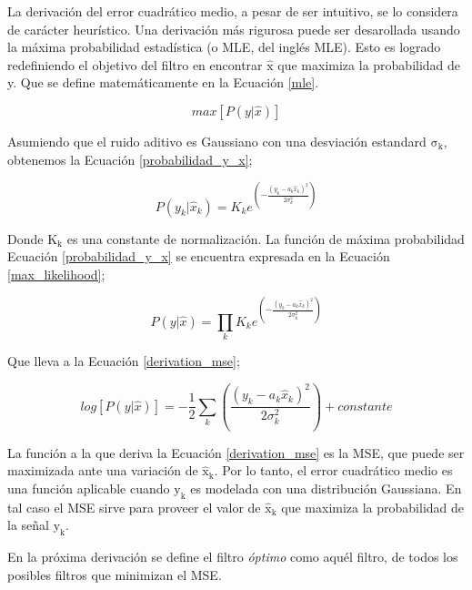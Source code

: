 \documentclass[10pt,a4paper]{article}
\begin{document}
La derivaci\'on del error cuadr\'atico medio, a pesar de ser intuitivo, se lo
considera de car\'acter heur\'istico. Una derivaci\'on m\'as rigurosa puede ser
desarollada usando la m\'axima probabilidad estad\'istica (o \acrshort{MLE}, del
ingl\'es \acrlong{MLE}). Esto es logrado redefiniendo el objetivo del filtro en
encontrar $\mathrm{\hat{x}}$ que maximiza la probabilidad de y. Que se define
matem\'aticamente en la Ecuaci\'on \ref{mle}.

\begin{equation}
    max\left[P\left(y|\hat{x}\right)\right] \label{mle}
\end{equation}

Asumiendo que el ruido aditivo es Gaussiano con una desviaci\'on estandard
$\mathrm{\sigma_k}$, obtenemos la Ecuaci\'on \ref{probabilidad_y_x};

\begin{equation}
    P\left(y_k|\hat{x}_k\right) = K_ke^{\left(- \frac{(y_k - a_k\hat{x}_k)^2}{2\sigma^2_k}\right)} \label{probabilidad_y_x}
\end{equation}

Donde $\mathrm{K_k}$ es una constante de normalizaci\'on. La funci\'on de
m\'axima probabilidad Ecuaci\'on \ref{probabilidad_y_x} se encuentra expresada
en la Ecuaci\'on \ref{max_likelihood};

\begin{equation}
    P(y|\hat{x}) = \prod_k K_ke^{\left(- \frac{(y_k - a_k\hat{x}_k)^2}{2\sigma^2_k}\right)} \label{max_likelihood}
\end{equation}

Que lleva a la Ecuaci\'on \ref{derivation_mse};

\begin{equation}
    log[P\left(y|\hat{x}\right)] = - \frac{1}{2}\sum_k \left(\frac{(y_k -
    a_k\hat{x}_k)^2}{2\sigma^2_k}\right) + constante \label{derivation_mse}
\end{equation}

La funci\'on a la que deriva la Ecuaci\'on \ref{derivation_mse} es la
\acrshort{MSE}, que puede ser maximizada ante una variaci\'on de
$\mathrm{\hat{x}_k}$. Por lo tanto, el error cuadr\'atico medio es una funci\'on
aplicable cuando $\mathrm{y_k}$ es modelada con una distribuci\'on Gaussiana.
En tal caso el \acrshort{MSE} sirve para proveer el valor de
$\mathrm{\hat{x}_k}$ que maximiza la probabilidad de la señal $\mathrm{y_k}$.

En la pr\'oxima derivaci\'on se define el filtro \emph{\'optimo} como aqu\'el
filtro, de todos los posibles filtros que minimizan el \acrshort{MSE}.
\end{document}
